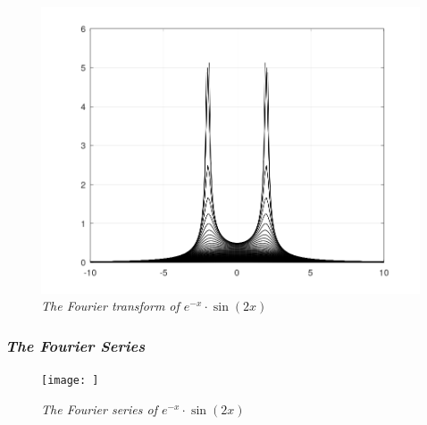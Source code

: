 			\begin{figure}[H]
			\centering
			\includegraphics[width=15cm]{FouPictures/bk.png}
    			\caption{\textit{The Fourier transform of $e^{-x}\cdot\sin\left(2x\right)$}}
			\end{figure}

	\subsubsection{\textit{The Fourier Series}}

		\textit{}

			\begin{figure}[H]
			\centering
			\texttt{[image: ]}
    			\caption{\textit{The Fourier series of $e^{-x}\cdot\sin\left(2x\right)$}}
			\end{figure}


